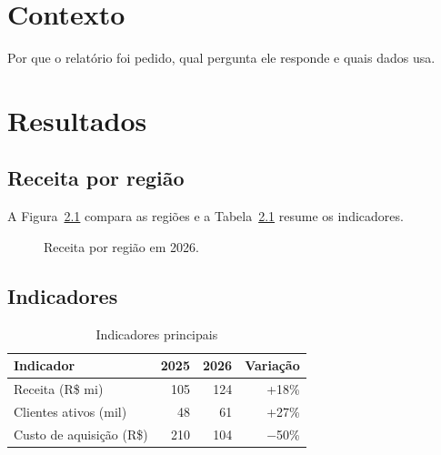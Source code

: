 \documentclass[11pt,a4paper]{report}
\begin{document}
\tableofcontents

\chapter{Contexto}
Por que o relatório foi pedido, qual pergunta ele responde e quais dados usa.

\chapter{Resultados}
\section{Receita por região}
A Figura~\ref{fig:receita} compara as regiões e a Tabela~\ref{tab:indicadores} resume os indicadores.

\begin{figure}[h]
  \centering
  \caption{Receita por região em 2026.}\label{fig:receita}
\end{figure}

\section{Indicadores}
\begin{table}[h]
  \centering
  \caption{Indicadores principais}\label{tab:indicadores}
  \begin{tabularx}{0.8\linewidth}{Xrrr}
    \toprule
    Indicador & 2025 & 2026 & Variação \\
    \midrule
    Receita (R\$ mi) & 105 & 124 & +18\% \\
    Clientes ativos (mil) & 48 & 61 & +27\% \\
    Custo de aquisição (R\$) & 210 & 104 & $-$50\% \\
    \bottomrule
  \end{tabularx}
\end{table}
\end{document}
